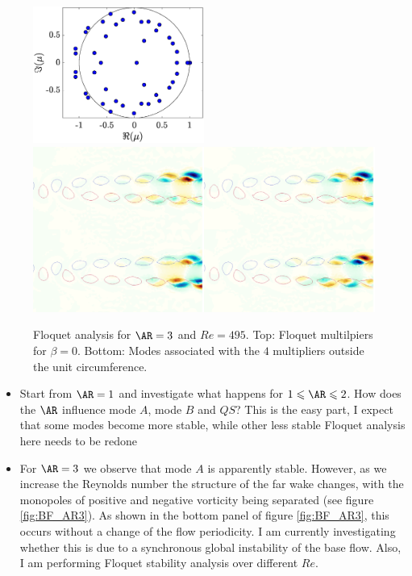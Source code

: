 \documentclass{jfm}
\begin{document}
\begin{figure}
  \centering
  \includegraphics[width=0.5\textwidth]{./fig/AR3/mult_Re495_beta0.eps}
  \includegraphics[width=1.0\textwidth]{./fig/AR3/Floquet_modes_beta_0_Re495.png}
  \caption{Floquet analysis for $\AR=3$ and $Re=495$. Top: Floquet multilpiers for $\beta = 0$. Bottom: Modes associated with the $4$ multipliers outside the unit circumference.}
  \label{fig:AR3_Stab}
\end{figure}


\begin{itemize}
  \item Start from $\AR=1$ and investigate what happens for $1 \le \AR \le 2$. How does the $\AR$ influence mode $A$, mode $B$ and $QS$? This is the easy part, I expect that some modes become more stable, while other less stable {\color{red} Floquet analysis here needs to be redone}
  \item For $\AR=3$ we observe that mode $A$ is apparently stable. However, as we increase the Reynolds number the structure of the far wake changes, with the monopoles of positive and negative vorticity being separated (see figure \ref{fig:BF_AR3}). As shown in the bottom panel of figure \ref{fig:BF_AR3}, this occurs without a change of the flow periodicity. {\color{red} I am currently investigating whether this is due to a synchronous global instability of the base flow. Also, I am performing Floquet stability analysis over different $Re$.}
\end{itemize}
\end{document}
